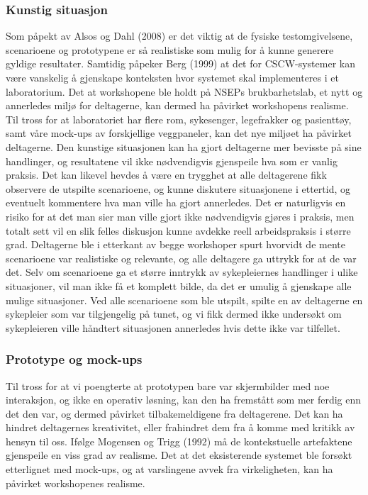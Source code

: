 \subsubsection{Kunstig situasjon}
Som påpekt av Alsos og Dahl (2008) er det viktig at de fysiske testomgivelsene, scenarioene og prototypene er så realistiske som mulig for å kunne generere gyldige resultater. Samtidig påpeker Berg (1999) at det for CSCW-systemer kan være vanskelig å gjenskape konteksten hvor systemet skal implementeres i et laboratorium. Det at workshopene ble holdt på NSEPs brukbarhetslab, et nytt og annerledes miljø for deltagerne, kan dermed ha påvirket workshopens realisme. Til tross for at laboratoriet har flere rom, sykesenger, legefrakker og pasienttøy, samt våre mock-ups av forskjellige veggpaneler, kan det nye miljøet ha påvirket deltagerne. Den kunstige situasjonen kan ha gjort deltagerne mer bevisste på sine handlinger, og resultatene vil ikke nødvendigvis gjenspeile hva som er vanlig praksis. Det kan likevel hevdes å være en trygghet at alle deltagerene fikk observere de utspilte scenarioene, og kunne diskutere situasjonene i ettertid, og eventuelt kommentere hva man ville ha gjort annerledes. Det er naturligvis en risiko for at det man sier man ville gjort ikke nødvendigvis gjøres i praksis, men totalt sett vil en slik felles diskusjon kunne avdekke reell arbeidspraksis i større grad. Deltagerne ble i etterkant av begge workshoper spurt hvorvidt de mente scenarioene var realistiske og relevante, og alle deltagere ga uttrykk for at de var det. Selv om scenarioene ga et større inntrykk av sykepleiernes handlinger i ulike situasjoner, vil man ikke få et komplett bilde, da det er umulig å gjenskape alle mulige situasjoner. Ved alle scenarioene som ble utspilt, spilte en av deltagerne en sykepleier som var tilgjengelig på tunet, og vi fikk dermed ikke undersøkt om sykepleieren ville håndtert situasjonen annerledes hvis dette ikke var tilfellet.

\subsubsection{Prototype og mock-ups}
Til tross for at vi poengterte at prototypen bare var skjermbilder med noe interaksjon, og ikke en operativ løsning, kan den ha fremstått som mer ferdig enn det den var, og dermed påvirket tilbakemeldigene fra deltagerene. Det kan ha hindret deltagernes kreativitet, eller frahindret dem fra å komme med kritikk av hensyn til oss. Ifølge Mogensen og Trigg (1992) må de kontekstuelle artefaktene gjenspeile en viss grad av realisme. Det at det eksisterende systemet ble forsøkt etterlignet med mock-ups, og at varslingene avvek fra virkeligheten, kan ha påvirket workshopenes realisme. 

